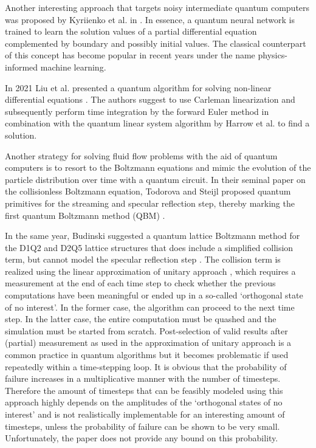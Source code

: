 Another interesting approach that targets noisy intermediate quantum computers was proposed by Kyriienko et al. in \cite{Kyriienko2021}. In essence, a quantum neural network is trained to learn the solution values of a partial differential equation complemented by boundary and possibly initial values. The classical counterpart of this concept has become popular in recent years under the name physics-informed machine learning.

In 2021 Liu et al. presented a quantum algorithm for solving non-linear differential equations \cite{Liu2021}. The authors suggest to use Carleman linearization and subsequently perform time integration by the forward Euler method in combination with the quantum linear system algorithm by Harrow et al. \cite{Harrow2009} to find a solution. 

Another strategy for solving fluid flow problems with the aid of quantum computers is to resort to the Boltzmann equations and mimic the evolution of the particle distribution over time with a quantum circuit.
In their seminal paper on the collisionless Boltzmann equation, Todorova and Steijl proposed quantum primitives for the streaming and specular reflection step, thereby marking the first quantum Boltzmann method (QBM) \cite{Todorova2020}.

In the same year, Budinski suggested a quantum lattice Boltzmann method for the D1Q2 and D2Q5 lattice structures that does include a simplified collision term, but cannot model the specular reflection step \cite{Budinski2020}. The collision term is realized using the linear approximation of unitary approach \cite{Low2019}, which requires a measurement at the end of each time step to check whether the previous computations have been meaningful or ended up in a so-called `orthogonal state of no interest'. In the former case, the algorithm can proceed to the next time step. In the latter case, the entire computation must be quashed and the simulation must be started from scratch. Post-selection of valid results after (partial) measurement as used in the approximation of unitary approach is a common practice in quantum algorithms but it becomes problematic if used repeatedly within a time-stepping loop. It is obvious that the probability of failure increases in a multiplicative manner with the number of timesteps. Therefore the amount of timesteps that can be feasibly modeled using this approach highly depends on the amplitudes of the `orthogonal states of no interest' and is not realistically implementable for an interesting amount of timesteps, unless the probability of failure can be shown to be very small. Unfortunately, the paper \cite{Budinski2020} does not provide any bound on this probability. 

